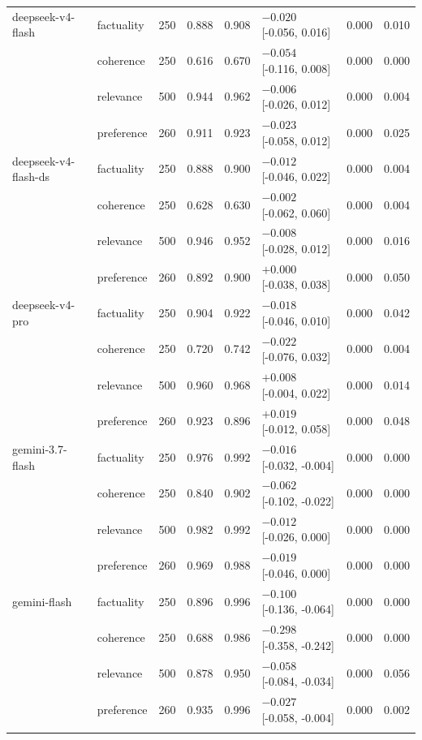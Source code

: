 \begin{table}[t]
\begin{tabular}{llrrrlrr}
\addlinespace
deepseek-v4-flash & factuality & 250 & 0.888 & 0.908 & $-0.020$ [-0.056, 0.016] & 0.000 & 0.010 \\
 & coherence & 250 & 0.616 & 0.670 & $-0.054$ [-0.116, 0.008] & 0.000 & 0.000 \\
 & relevance & 500 & 0.944 & 0.962 & $-0.006$ [-0.026, 0.012] & 0.000 & 0.004 \\
 & preference & 260 & 0.911 & 0.923 & $-0.023$ [-0.058, 0.012] & 0.000 & 0.025 \\
\addlinespace
deepseek-v4-flash-ds & factuality & 250 & 0.888 & 0.900 & $-0.012$ [-0.046, 0.022] & 0.000 & 0.004 \\
 & coherence & 250 & 0.628 & 0.630 & $-0.002$ [-0.062, 0.060] & 0.000 & 0.004 \\
 & relevance & 500 & 0.946 & 0.952 & $-0.008$ [-0.028, 0.012] & 0.000 & 0.016 \\
 & preference & 260 & 0.892 & 0.900 & $+0.000$ [-0.038, 0.038] & 0.000 & 0.050 \\
\addlinespace
deepseek-v4-pro & factuality & 250 & 0.904 & 0.922 & $-0.018$ [-0.046, 0.010] & 0.000 & 0.042 \\
 & coherence & 250 & 0.720 & 0.742 & $-0.022$ [-0.076, 0.032] & 0.000 & 0.004 \\
 & relevance & 500 & 0.960 & 0.968 & $+0.008$ [-0.004, 0.022] & 0.000 & 0.014 \\
 & preference & 260 & 0.923 & 0.896 & $+0.019$ [-0.012, 0.058] & 0.000 & 0.048 \\
\addlinespace
gemini-3.7-flash & factuality & 250 & 0.976 & 0.992 & $-0.016$ [-0.032, -0.004] & 0.000 & 0.000 \\
 & coherence & 250 & 0.840 & 0.902 & $-0.062$ [-0.102, -0.022] & 0.000 & 0.000 \\
 & relevance & 500 & 0.982 & 0.992 & $-0.012$ [-0.026, 0.000] & 0.000 & 0.000 \\
 & preference & 260 & 0.969 & 0.988 & $-0.019$ [-0.046, 0.000] & 0.000 & 0.000 \\
\addlinespace
gemini-flash & factuality & 250 & 0.896 & 0.996 & $-0.100$ [-0.136, -0.064] & 0.000 & 0.000 \\
 & coherence & 250 & 0.688 & 0.986 & $-0.298$ [-0.358, -0.242] & 0.000 & 0.000 \\
 & relevance & 500 & 0.878 & 0.950 & $-0.058$ [-0.084, -0.034] & 0.000 & 0.056 \\
 & preference & 260 & 0.935 & 0.996 & $-0.027$ [-0.058, -0.004] & 0.000 & 0.002 \\
\addlinespace

\end{tabular}
\end{table}
